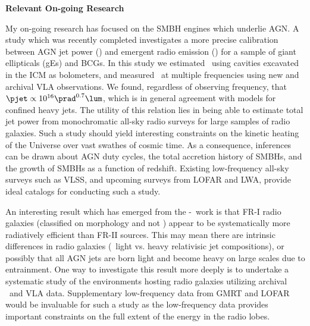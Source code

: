 \documentclass[12pt]{article}
\begin{document}
{\bf{Relevant On-going Research}}


My on-going research has focused on the SMBH engines which underlie
AGN. A study which was recently completed \cite{pjet} investigates a
more precise calibration between AGN jet power (\pjet) and emergent
radio emission (\prad) for a sample of giant ellipticals (gEs) and
BCGs. In this study we estimated \pjet\ using cavities excavated in
the ICM as bolometers, and measured \prad\ at multiple frequencies
using new and archival VLA observations. We found, regardless of
observing frequency, that $\pjet \propto 10^{16} \prad^{0.7} \lum$,
which is in general agreement with models for confined heavy jets. The
utility of this relation lies in being able to estimate total jet
power from monochromatic all-sky radio surveys for large samples of
radio galaxies. Such a study should yield interesting constraints on
the kinetic heating of the Universe over vast swathes of cosmic
time. As a consequence, inferences can be drawn about AGN duty cycles,
the total accretion history of SMBHs, and the growth of SMBHs as a
function of redshift. Existing low-frequency all-sky surveys such as
VLSS, and upcoming surveys from LOFAR and LWA, provide ideal catalogs
for conducting such a study.

An interesting result which has emerged from the \pjet-\prad\ work is
that FR-I radio galaxies (classified on morphology and not \prad)
appear to be systematically more radiatively efficient than FR-II
sources. This may mean there are intrinsic differences in radio
galaxies (\ie\ light vs. heavy relativisic jet compositions), or
possibly that all AGN jets are born light and become heavy on large
scales due to entrainment. One way to investigate this result more
deeply is to undertake a systematic study of the environments hosting
radio galaxies utilizing archival \chandra\ and VLA
data. Supplementary low-frequency data from GMRT and LOFAR would be
invaluable for such a study as the low-frequency data provides
important constraints on the full extent of the energy in the radio
lobes.
\end{document}
